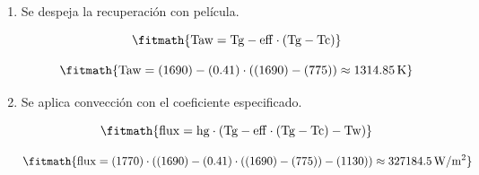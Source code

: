 \begin{enumerate}

\item Se despeja la recuperación con película.

\[\fitmath{\mathrm{Taw}=\mathrm{Tg}-\mathrm{eff}\cdot \left(\mathrm{Tg}-\mathrm{Tc}\right)}\]

\[\fitmath{\mathrm{Taw}=(1690)-(0.41)\cdot \left((1690)-(775)\right)\approx 1314.85\,\mathrm{K}}\]

\item Se aplica convección con el coeficiente especificado.

\[\fitmath{\mathrm{flux}=\mathrm{hg}\cdot \left(\mathrm{Tg}-\mathrm{eff}\cdot \left(\mathrm{Tg}-\mathrm{Tc}\right)-\mathrm{Tw}\right)}\]

\[\fitmath{\mathrm{flux}=(1770)\cdot \left((1690)-(0.41)\cdot \left((1690)-(775)\right)-(1130)\right)\approx 327184.5\,\mathrm{W/m^{2}}}\]

\end{enumerate}
